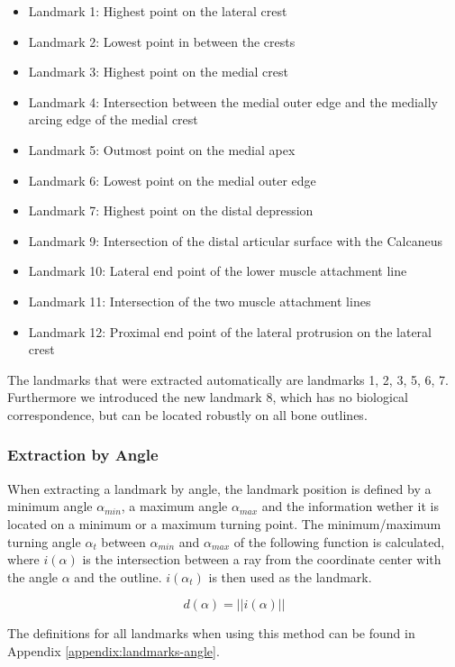 \documentclass[pdftex,12pt,a4paper]{report}
\begin{document}
\begin{itemize}
\item Landmark 1: Highest point on the lateral crest
\item Landmark 2: Lowest point in between the crests
\item Landmark 3: Highest point on the medial crest
\item Landmark 4: Intersection between the medial outer edge and the medially arcing edge of the medial crest
\item Landmark 5: Outmost point on the medial apex
\item Landmark 6: Lowest point on the medial outer edge
\item Landmark 7: Highest point on the distal depression
\item Landmark 9: Intersection of the distal articular surface with the Calcaneus
\item Landmark 10: Lateral end point of the lower muscle attachment line
\item Landmark 11: Intersection of the two muscle attachment lines
\item Landmark 12: Proximal end point of the lateral protrusion on the lateral crest
\end{itemize}

The landmarks that were extracted automatically are landmarks 1, 2, 3, 5, 6, 7. Furthermore we introduced the new
landmark 8, which has no biological correspondence, but can be located robustly on all bone outlines.

\subsubsection{Extraction by Angle}

When extracting a landmark by angle, the landmark position is defined by a minimum angle $\alpha_{min}$, a maximum
angle $\alpha_{max}$ and the information wether it is located on a minimum or a maximum turning point.
The minimum/maximum turning angle $\alpha_{t}$ between $\alpha_{min}$ and $\alpha_{max}$ of the following function
is calculated, where $i(\alpha)$ is the intersection between a ray from the coordinate center with the angle $\alpha$ and
the outline. $i(\alpha_t)$ is then used as the landmark.

\begin{equation}
d(\alpha) = ||i(\alpha)||
\end{equation}

The definitions for all landmarks when using this method can be found in Appendix \ref{appendix:landmarks-angle}.
\end{document}
